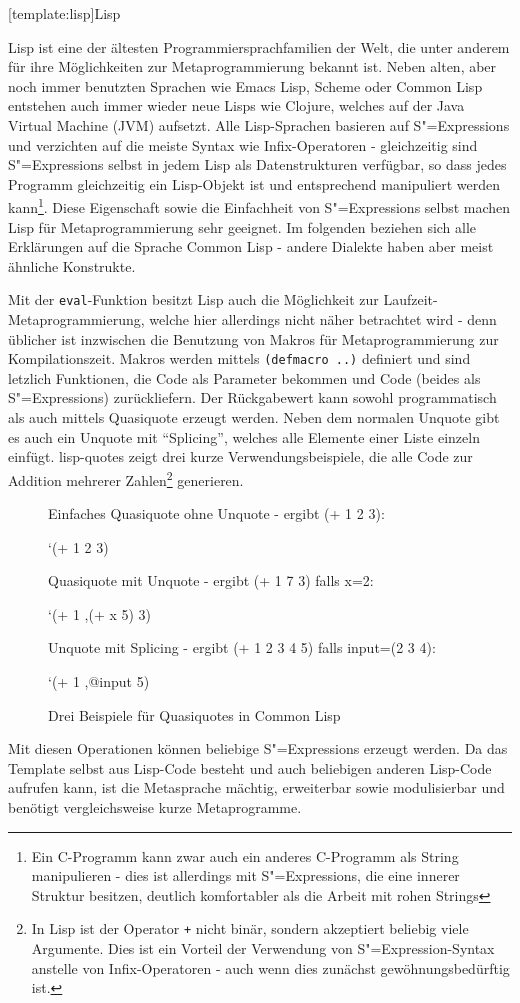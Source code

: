 \documentclass[11pt, a4paper, bibgerm]{book}
\newcommand\icode[1]{\lstinline?#1?}
\newcommand\lsection{}
\newcommand\abb{}
\newcommand{\sexp}{S"=Expression}
\newcommand{\sexps}{S"=Expressions}
\begin{document}
\lsection[template:lisp]{Lisp}

Lisp ist eine der ältesten Programmiersprachfamilien der Welt, die unter
anderem für ihre Möglichkeiten zur Metaprogrammierung bekannt ist. Neben
alten, aber noch immer benutzten Sprachen wie Emacs Lisp, Scheme oder
Common Lisp entstehen auch immer wieder neue Lisps wie
Clojure\cite{Clojure}, welches auf der Java Virtual Machine (JVM)
aufsetzt. Alle Lisp-Sprachen basieren auf \sexps{} und verzichten auf
die meiste Syntax wie Infix-Operatoren - gleichzeitig sind \sexps{}
selbst in jedem Lisp als Datenstrukturen verfügbar, so dass jedes
Programm gleichzeitig ein Lisp-Objekt ist und entsprechend manipuliert
werden kann\footnote{Ein C-Programm kann zwar auch ein anderes
  C-Programm als String manipulieren - dies ist allerdings mit \sexps{},
  die eine innerer Struktur besitzen, deutlich komfortabler als die
  Arbeit mit rohen Strings}. Diese Eigenschaft sowie die Einfachheit von
\sexps{} selbst machen Lisp für Metaprogrammierung sehr geeignet. Im
folgenden beziehen sich alle Erklärungen auf die Sprache Common Lisp -
andere Dialekte haben aber meist ähnliche Konstrukte.

Mit der \icode{eval}-Funktion besitzt Lisp auch die Möglichkeit zur
Laufzeit-Metaprogrammierung, welche hier allerdings nicht näher
betrachtet wird - denn üblicher ist inzwischen die Benutzung von Makros
für Metaprogrammierung zur Kompilationszeit. Makros werden mittels
\icode{(defmacro ..)} definiert und sind letzlich Funktionen, die Code
als Parameter bekommen und Code (beides als \sexps{}) zurückliefern. Der
Rückgabewert kann sowohl programmatisch als auch mittels Quasiquote
erzeugt werden. Neben dem normalen Unquote gibt es auch ein Unquote mit
"`Splicing"', welches alle Elemente einer Liste einzeln
einfügt. \abb{lisp-quotes} zeigt drei kurze Verwendungsbeispiele, die
alle Code zur Addition mehrerer Zahlen\footnote{In Lisp ist der Operator
  \icode{+} nicht binär, sondern akzeptiert beliebig viele
  Argumente. Dies ist ein Vorteil der Verwendung von \sexp{}-Syntax
  anstelle von Infix-Operatoren - auch wenn dies zunächst
  gewöhnungsbedürftig ist.} generieren.

\begin{figure}
  \centering
  \begin{code}
Einfaches Quasiquote ohne Unquote - ergibt (+ 1 2 3):

 `(+ 1 2 3)


Quasiquote mit Unquote - ergibt (+ 1 7 3) falls x=2:

`(+ 1 ,(+ x 5) 3)


Unquote mit Splicing - ergibt (+ 1 2 3 4 5) falls input=(2 3 4):

`(+ 1 ,@input 5)
  \end{code}
  \caption{Drei Beispiele für Quasiquotes in Common Lisp}
  \label{magicl:fig:lisp-quotes}
\end{figure}
Mit diesen Operationen können beliebige \sexps{} erzeugt werden. Da das
Template selbst aus Lisp-Code besteht und auch beliebigen anderen
Lisp-Code aufrufen kann, ist die Metasprache mächtig, erweiterbar sowie
modulisierbar und benötigt vergleichsweise kurze
Metaprogramme.
\end{document}
